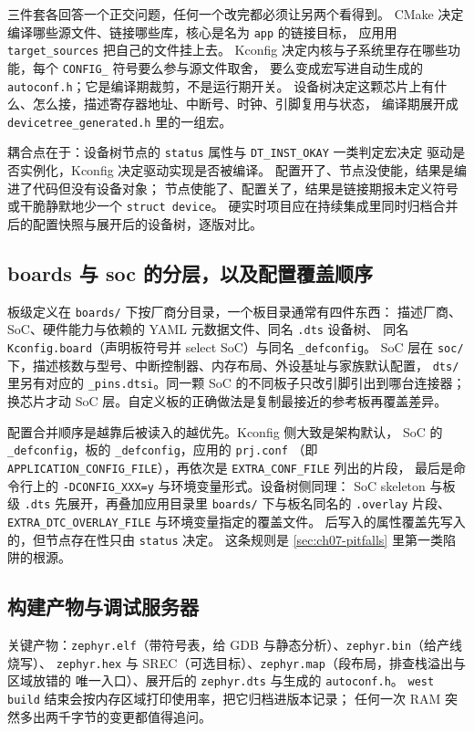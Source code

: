\documentclass[12pt,a4paper,fontset=fandol]{ctexbook}
\newcommand{\Tp}[1]{\texttt{#1}}
\newcommand{\Lang}[1]{\textsf{#1}}
\begin{document}
三件套各回答一个正交问题，任何一个改完都必须让另两个看得到。
\Lang{CMake} 决定编译哪些源文件、链接哪些库，核心是名为 \Tp{app} 的链接目标，
应用用 \Tp{target\_sources} 把自己的文件挂上去。
Kconfig 决定内核与子系统里存在哪些功能，每个 \Tp{CONFIG\_} 符号要么参与源文件取舍，
要么变成宏写进自动生成的 \Tp{autoconf.h}；它是编译期裁剪，不是运行期开关。
设备树决定这颗芯片上有什么、怎么接，描述寄存器地址、中断号、时钟、引脚复用与状态，
编译期展开成 \Tp{devicetree\_generated.h} 里的一组宏。

耦合点在于：设备树节点的 \Tp{status} 属性与 \Tp{DT\_INST\_OKAY} 一类判定宏决定
驱动是否实例化，Kconfig 决定驱动实现是否被编译。
配置开了、节点没使能，结果是编进了代码但没有设备对象；
节点使能了、配置关了，结果是链接期报未定义符号或干脆静默地少一个 \Tp{struct device}。
硬实时项目应在持续集成里同时归档合并后的配置快照与展开后的设备树，逐版对比。

\subsection{boards 与 soc 的分层，以及配置覆盖顺序}

板级定义在 \Tp{boards/} 下按厂商分目录，一个板目录通常有四件东西：
描述厂商、SoC、硬件能力与依赖的 YAML 元数据文件、同名 \Tp{.dts} 设备树、
同名 \Tp{Kconfig.board}（声明板符号并 select SoC）与同名 \Tp{\_defconfig}。
SoC 层在 \Tp{soc/} 下，描述核数与型号、中断控制器、内存布局、外设基址与家族默认配置，
\Tp{dts/} 里另有对应的 \Tp{\_pins.dtsi}。同一颗 SoC 的不同板子只改引脚引出到哪台连接器；
换芯片才动 SoC 层。自定义板的正确做法是复制最接近的参考板再覆盖差异。

配置合并顺序是越靠后被读入的越优先。Kconfig 侧大致是架构默认，
SoC 的 \Tp{\_defconfig}，板的 \Tp{\_defconfig}，应用的 \Tp{prj.conf}
（即 \Tp{APPLICATION\_CONFIG\_FILE}），再依次是 \Tp{EXTRA\_CONF\_FILE} 列出的片段，
最后是命令行上的 \Tp{-DCONFIG\_XXX=y} 与环境变量形式。设备树侧同理：
SoC skeleton 与板级 \Tp{.dts} 先展开，再叠加应用目录里 \Tp{boards/} 下与板名同名的
\Tp{.overlay} 片段、\Tp{EXTRA\_DTC\_OVERLAY\_FILE} 与环境变量指定的覆盖文件。
后写入的属性覆盖先写入的，但节点存在性只由 \Tp{status} 决定。
这条规则是 \ref{sec:ch07-pitfalls} 里第一类陷阱的根源。

\subsection{构建产物与调试服务器}

关键产物：\Tp{zephyr.elf}（带符号表，给 GDB 与静态分析）、\Tp{zephyr.bin}（给产线烧写）、
\Tp{zephyr.hex} 与 SREC（可选目标）、\Tp{zephyr.map}（段布局，排查栈溢出与区域放错的
唯一入口）、展开后的 \Tp{zephyr.dts} 与生成的 \Tp{autoconf.h}。
\Tp{west build} 结束会按内存区域打印使用率，把它归档进版本记录；
任何一次 RAM 突然多出两千字节的变更都值得追问。
\end{document}
